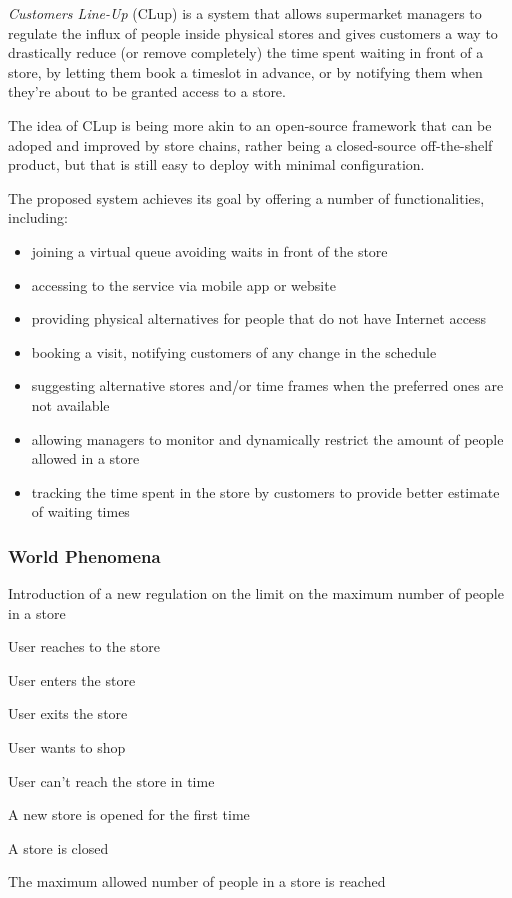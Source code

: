 \emph{Customers Line-Up} (CLup) is a system that allows supermarket managers to regulate the influx of people inside physical stores and gives customers a way to drastically reduce (or remove completely) the time spent
waiting in front of a store, by letting them book a timeslot in advance, or by notifying them when they're about to be granted access to a store.

The idea of CLup is being more akin to an open-source framework that can be adoped and improved by store chains, rather being a closed-source off-the-shelf product, but that is still easy to deploy with minimal configuration.

The proposed system achieves its goal by offering a number of functionalities, including:
\begin{itemize}
    \item joining a virtual queue avoiding waits in front of the store
    \item accessing to the service via mobile app or website
    \item providing physical alternatives for people that do not have Internet access
    \item booking a visit, notifying customers of any change in the schedule
    \item suggesting alternative stores and/or time frames when the preferred ones are not available
    \item allowing managers to monitor and dynamically restrict the amount of people allowed in a store
    \item tracking the time spent in the store by customers to provide better estimate of waiting times
\end{itemize}

\subsubsection{World Phenomena}
\begin{enumerate}[label={[WP\arabic*]}]
    \item Introduction of a new regulation on the limit on the maximum number of people in a store
    \item User reaches to the store
    \item User enters the store
    \item User exits the store
    \item User wants to shop
    \item User can't reach the store in time
    \item A new store is opened for the first time
    \item A store is closed
    \item The maximum allowed number of people in a store is reached
\end{enumerate}

